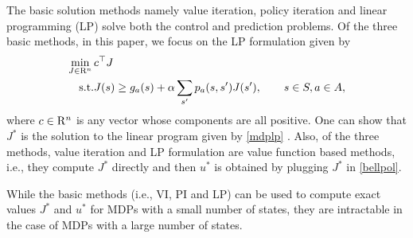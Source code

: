 The basic solution methods namely value iteration, policy iteration and linear programming (LP) \cite{BertB} solve both the control and prediction problems. Of the three basic methods, in this paper, we focus on the LP formulation given by
\begin{align}\label{mdplp}
\begin{split}
\min_{J\in \R^n}\, &c^\top J\\
\text{s.t.}\mb &J(s)\geq g_a(s)+\alpha\sum_{s'}p_a(s,s')J(s'), \qquad s\in S, a \in A,
\end{split}
\end{align}
where $c\in \mathrm{R}^n$ is any vector whose components are all positive.
One can show that $J^*$ is the solution to the linear program given by \eqref{mdplp} \cite{BertB}. 
Also, of the three methods, value iteration and LP formulation are value function based methods, i.e., they compute $J^*$ directly and then $u^*$ is obtained by plugging $J^*$ in \eqref{bellpol}.

While the basic methods (i.e., VI, PI and LP) can be used to compute exact values $J^*$ and $u^*$ for MDPs with a small number of states, they are intractable in the case of MDPs with a large number of states.
